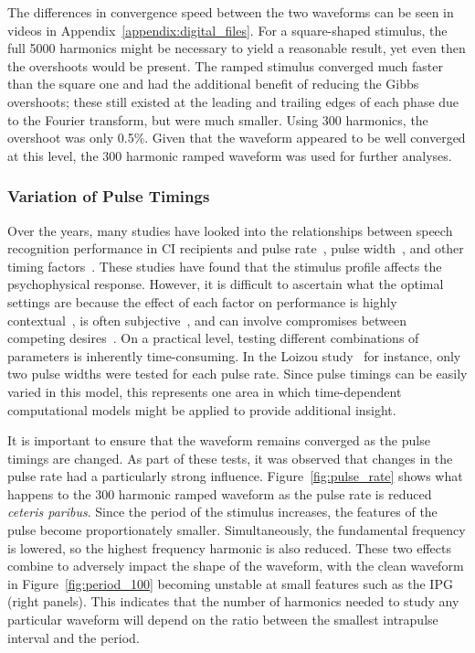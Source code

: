 The differences in convergence speed between the two waveforms can be seen in
videos in Appendix~\ref{appendix:digital_files}. For a square-shaped stimulus,
the full 5000 harmonics might be necessary to yield a reasonable result, yet
even then the overshoots would be present. The ramped stimulus converged much
faster than the square one and had the additional benefit of reducing the Gibbs
overshoots; these still existed at the leading and trailing edges of each phase
due to the Fourier transform, but were much smaller. Using 300 harmonics, the
overshoot was only 0.5\%. Given that the waveform appeared to be well converged
at this level, the 300 harmonic ramped waveform was used for further analyses.

\subsubsection{Variation of Pulse Timings}

Over the years, many studies have looked into the relationships between speech
recognition performance in CI recipients and pulse
rate~\cite{wilson1991,vandali2000,loizou2000,friesen2005,shannon2010}, pulse
width~\cite{wilson1991,shannon1993,loizou2000}, and other timing
factors~\cite{middlebrooks2004}. These studies have found that the stimulus
profile affects the psychophysical response. However, it is difficult to
ascertain what the optimal settings are because the effect of each factor on
performance is highly contextual~\cite{loizou2000}, is often
subjective~\cite{shannon2010}, and can involve compromises between competing
desires~\cite{wilson1991}. On a practical level, testing different combinations
of parameters is inherently time-consuming. In the Loizou
study~\cite{loizou2000} for instance, only two pulse widths were tested for each
pulse rate. Since pulse timings can be easily varied in this model, this
represents one area in which time-dependent computational models might be
applied to provide additional insight.

It is important to ensure that the waveform remains converged as the pulse
timings are changed. As part of these tests, it was observed that changes in the
pulse rate had a particularly strong influence. Figure~\ref{fig:pulse_rate}
shows what happens to the 300 harmonic ramped waveform as the pulse rate is
reduced \textit{ceteris paribus}. Since the period of the stimulus increases,
the features of the pulse become proportionately smaller. Simultaneously, the
fundamental frequency is lowered, so the highest frequency harmonic is also
reduced. These two effects combine to adversely impact the shape of the
waveform, with the clean waveform in Figure~\ref{fig:period_100} becoming
unstable at small features such as the IPG (right panels). This indicates that
the number of harmonics needed to study any particular waveform will depend on
the ratio between the smallest intrapulse interval and the period.

